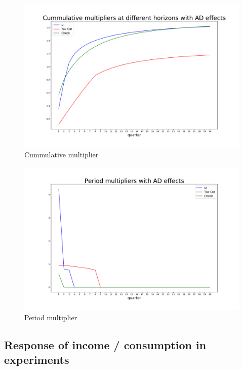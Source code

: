 \documentclass[]{article}
\begin{document}
\begin{enumerate}
	\begin{figure}
		\centering
		\includegraphics[width=\linewidth]{../Full_Run_3Educ_Nov4th/C_multipliers}
		\caption{Cummulative multiplier}
		\label{fig:cmultipliers}
	\end{figure}

	\begin{figure}[h!]
	\centering
	\includegraphics[width=\linewidth]{../Full_Run_3Educ_Nov4th/P_multipliers}
	\caption{Period multiplier}
	\label{fig:pmultipliers}
	\end{figure}
	
\end{enumerate}




\FloatBarrier
\subsection{Response of income / consumption in experiments}
\end{document}
